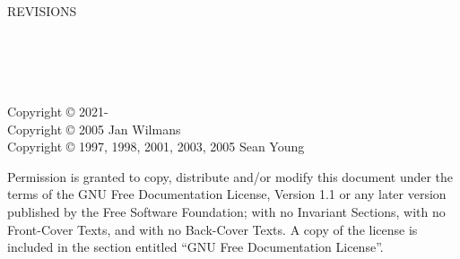 \begingroup
	{\WorkInProgressFullScreen}

	\vspace*{\fill} %

	{\Large\textbf{\BookTitle}}

	\vspace*{0.1cm}

	{\large\AuthorNameSurname}

	\LatestRevisionName{}

	REVISIONS\\
	\LatestRevisionDate{}\\
	\RevisionFourDate{}\\
	\RevisionThreeDate{}\\
	\RevisionTwoDate{}\\
	\RevisionOneDate{}

	\vspace*{0.2cm}

	Copyright {\copyright} 2021-\LatestYear{} \AuthorNameSurname{}\\	%
	Copyright {\copyright} 2005 Jan Wilmans\\
	Copyright {\copyright} 1997, 1998, 2001, 2003, 2005 Sean Young

	Permission is granted to copy, distribute and/or modify this document under the terms of the GNU Free Documentation License, Version 1.1 or any later version published by the Free Software Foundation; with no Invariant Sections, with no Front-Cover Texts, and with no Back-Cover Texts. A copy of the license is included in the section entitled ``GNU Free Documentation License''.
\endgroup
